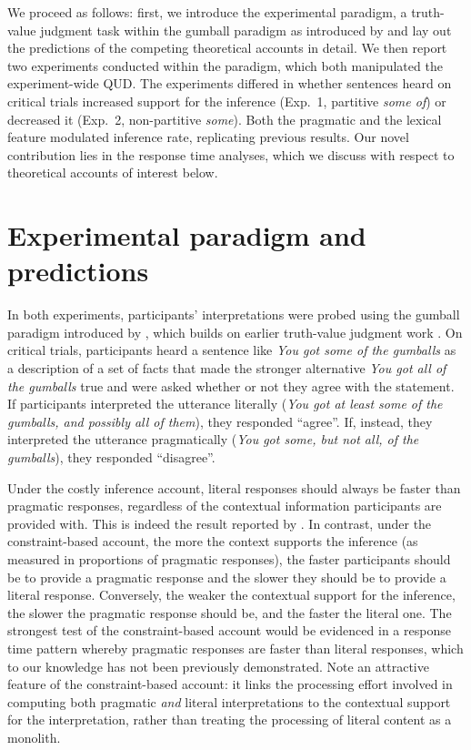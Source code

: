 \documentclass[10pt,letterpaper]{article}
\begin{document}
We proceed as follows: first, we introduce the experimental paradigm, a truth-value judgment task within the gumball paradigm as introduced by  and lay out the predictions of the competing theoretical accounts in detail. We then report two experiments conducted within the paradigm, which both manipulated the experiment-wide QUD. The experiments differed in whether  sentences heard on critical trials increased support for the inference (Exp.~1, partitive \emph{some of}) or decreased it (Exp.~2, non-partitive \emph{some}). Both the pragmatic and the lexical feature modulated inference rate, replicating previous results. Our  novel contribution lies in the response time analyses, which we discuss with respect to  theoretical accounts of interest below.

\section{Experimental paradigm and predictions}

In both experiments, participants' interpretations were probed using the gumball paradigm introduced by , which builds on earlier truth-value judgment work \cite{BottNoveck2004}. On critical trials, participants heard a sentence like \emph{You got some of the gumballs} as a description of a set of facts that made the stronger alternative \emph{You got all of the gumballs} true and were asked whether or not they agree with the statement. If participants interpreted the utterance literally (\emph{You got at least some of the gumballs, and possibly all of them}), they responded ``agree''. If, instead, they interpreted the utterance pragmatically (\emph{You got some, but not all, of the gumballs}), they responded ``disagree''. 

Under the costly inference account, literal responses should always be faster than pragmatic responses, regardless of the contextual information participants are provided with. This is indeed the result reported by . In contrast, under the constraint-based account, the more the context supports the inference (as measured in proportions of pragmatic responses), the faster participants should be to provide a pragmatic response and  the slower they should be to provide a literal response. Conversely, the weaker the contextual support for the inference, the slower the pragmatic response should be, and the faster the literal one. The strongest test of the constraint-based account would be evidenced in a response time pattern whereby pragmatic responses are faster than literal responses, which to our knowledge has not been previously demonstrated. Note an attractive feature of the constraint-based account: it links the processing effort involved in computing both pragmatic \emph{and} literal interpretations to the contextual support for the interpretation, rather than treating the processing of literal content as a monolith.
\end{document}
